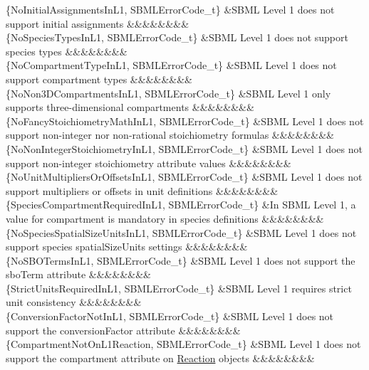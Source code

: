 \begin{DoxyParagraph}{}
\begin{longtabu}
\{No\+Initial\+Assignments\+In\+L1, S\+B\+M\+L\+Error\+Code\+\_\+t\} &S\+B\+ML Level 1 does not support initial assignments &&&&&&&&\\
\{No\+Species\+Types\+In\+L1, S\+B\+M\+L\+Error\+Code\+\_\+t\} &S\+B\+ML Level 1 does not support species types &&&&&&&&\\
\{No\+Compartment\+Type\+In\+L1, S\+B\+M\+L\+Error\+Code\+\_\+t\} &S\+B\+ML Level 1 does not support compartment types &&&&&&&&\\
\{No\+Non3\+D\+Compartments\+In\+L1, S\+B\+M\+L\+Error\+Code\+\_\+t\} &S\+B\+ML Level 1 only supports three-\/dimensional compartments &&&&&&&&\\
\{No\+Fancy\+Stoichiometry\+Math\+In\+L1, S\+B\+M\+L\+Error\+Code\+\_\+t\} &S\+B\+ML Level 1 does not support non-\/integer nor non-\/rational stoichiometry formulas &&&&&&&&\\
\{No\+Non\+Integer\+Stoichiometry\+In\+L1, S\+B\+M\+L\+Error\+Code\+\_\+t\} &S\+B\+ML Level 1 does not support non-\/integer \textquotesingle{}stoichiometry\textquotesingle{} attribute values &&&&&&&&\\
\{No\+Unit\+Multipliers\+Or\+Offsets\+In\+L1, S\+B\+M\+L\+Error\+Code\+\_\+t\} &S\+B\+ML Level 1 does not support multipliers or offsets in unit definitions &&&&&&&&\\
\{Species\+Compartment\+Required\+In\+L1, S\+B\+M\+L\+Error\+Code\+\_\+t\} &In S\+B\+ML Level 1, a value for \textquotesingle{}compartment\textquotesingle{} is mandatory in species definitions &&&&&&&&\\
\{No\+Species\+Spatial\+Size\+Units\+In\+L1, S\+B\+M\+L\+Error\+Code\+\_\+t\} &S\+B\+ML Level 1 does not support species \textquotesingle{}spatial\+Size\+Units\textquotesingle{} settings &&&&&&&&\\
\{No\+S\+B\+O\+Terms\+In\+L1, S\+B\+M\+L\+Error\+Code\+\_\+t\} &S\+B\+ML Level 1 does not support the \textquotesingle{}sbo\+Term\textquotesingle{} attribute &&&&&&&&\\
\{Strict\+Units\+Required\+In\+L1, S\+B\+M\+L\+Error\+Code\+\_\+t\} &S\+B\+ML Level 1 requires strict unit consistency &&&&&&&&\\
\{Conversion\+Factor\+Not\+In\+L1, S\+B\+M\+L\+Error\+Code\+\_\+t\} &S\+B\+ML Level 1 does not support the \textquotesingle{}conversion\+Factor\textquotesingle{} attribute &&&&&&&&\\
\{Compartment\+Not\+On\+L1\+Reaction, S\+B\+M\+L\+Error\+Code\+\_\+t\} &S\+B\+ML Level 1 does not support the \textquotesingle{}compartment\textquotesingle{} attribute on \hyperlink{class_reaction}{Reaction} objects &&&&&&&&\\

\end{longtabu}
\end{DoxyParagraph}
